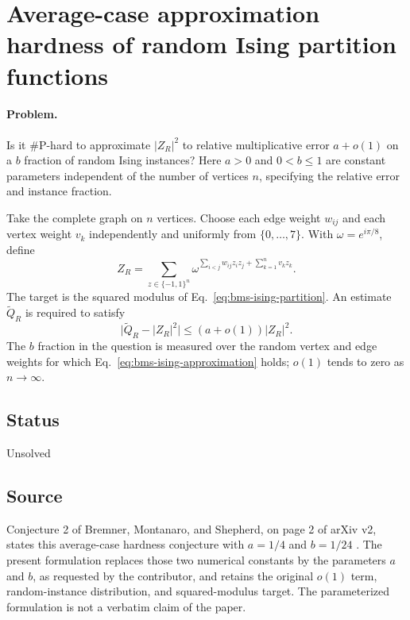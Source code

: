 \section{Average-case approximation hardness of random Ising partition functions}
\label{sec:op_378472b2da3c533d}

\paragraph{Problem.}
Is it $\#\mathrm{P}$-hard to approximate $|Z_R|^2$ to relative multiplicative
error $a+o(1)$ on a $b$ fraction of random Ising instances?
Here $a>0$ and $0<b\leq1$ are constant parameters independent of the number
of vertices $n$, specifying the relative error and instance fraction.

Take the complete graph on $n$ vertices. Choose each edge weight $w_{ij}$
and each vertex weight $v_k$ independently and uniformly from
$\{0,\ldots,7\}$. With $\omega=e^{i\pi/8}$, define
\begin{equation}
  Z_R=\sum_{z\in\{-1,1\}^n}
    \omega^{\sum_{i<j}w_{ij}z_i z_j+\sum_{k=1}^n v_k z_k}.
  \label{eq:bms-ising-partition}
\end{equation}
The target is the squared modulus of Eq.~\eqref{eq:bms-ising-partition}.
An estimate $\widetilde Q_R$ is required to satisfy
\begin{equation}
  \bigl|\widetilde Q_R-|Z_R|^2\bigr|
    \leq (a+o(1))|Z_R|^2.
  \label{eq:bms-ising-approximation}
\end{equation}
The $b$ fraction in the question is measured over the random vertex and edge
weights for which Eq.~\eqref{eq:bms-ising-approximation} holds; $o(1)$ tends
to zero as $n\to\infty$.

\subsection*{Status}

Unsolved

\subsection*{Source}

Conjecture 2 of Bremner, Montanaro, and Shepherd, on page 2 of arXiv v2,
states this average-case hardness conjecture with $a=1/4$ and $b=1/24$
.
The present formulation replaces those two numerical constants by the
parameters $a$ and $b$, as requested by the contributor, and retains the
original $o(1)$ term, random-instance distribution, and squared-modulus target.
The parameterized formulation is not a verbatim claim of the paper.

